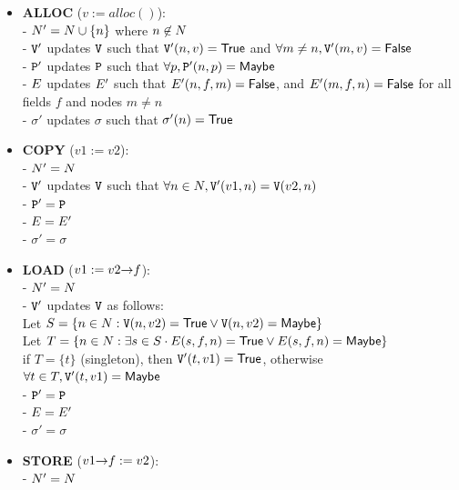 \begin{itemize}
  \item \textbf{ALLOC} ($v := alloc()$): \\
    - $N' = N \cup \{n\}$ where $n \not \in N$ \\
    - $\mathtt{V}'$ updates $\mathtt{V}$ such that $\mathtt{V}'(n, v) = \mathsf{True}$ and $\forall m \neq n, \mathtt{V}'(m, v) = \mathsf{False}$ \\
    - $\mathtt{P}'$ updates $\mathtt{P}$ such that $\forall p, \mathtt{P}'(n, p) = \mathsf{Maybe}$ \\
    - $E$ updates $E'$ such that $E'(n,f,m) = \mathsf{False}$, and $E'(m,f,n) = \mathsf{False}$ for all fields $f$ and nodes $m \neq n$ \\
    - $\sigma'$ updates $\sigma$ such that $\sigma'(n) = \mathsf{True}$
  \item \textbf{COPY} ($v1 := v2$): \\
    - $N' = N$ \\
    - $\mathtt{V}'$ updates $\mathtt{V}$ such that $\forall n \in N, \mathtt{V}'(v1, n) = \mathtt{V}(v2, n)$ \\
    - $\mathtt{P}' = \mathtt{P}$ \\
    - $E = E'$ \\
    - $\sigma' = \sigma$
  \item \textbf{LOAD} ($v1 := v2 \mathtt{->} f$): \\
    - $N' = N$ \\
    - $\mathtt{V}'$ updates $\mathtt{V}$ as follows: \\
      \hspace*{1em} Let $S = \{n \in N : \mathtt{V}(n, v2) = \mathsf{True} \vee \mathtt{V}(n, v2) = \mathsf{Maybe}\}$ \\
      \hspace*{1em} Let $T = \{n \in N : \exists s \in S \cdot E(s, f, n) = \mathsf{True} \vee E(s, f, n) = \mathsf{Maybe}\}$ \\
      \hspace*{1em} if $T = \{t\}$ (singleton), then $\mathtt{V}'(t, v1) = \mathsf{True}$, otherwise $\forall t \in T, \mathtt{V}'(t, v1) = \mathsf{Maybe}$ \\
    - $\mathtt{P}' = \mathtt{P}$ \\
    - $E = E'$ \\
    - $\sigma' = \sigma$
  \item \textbf{STORE} ($v1 \mathtt{->} f := v2$): \\
    - $N' = N$ \\

\end{itemize}
